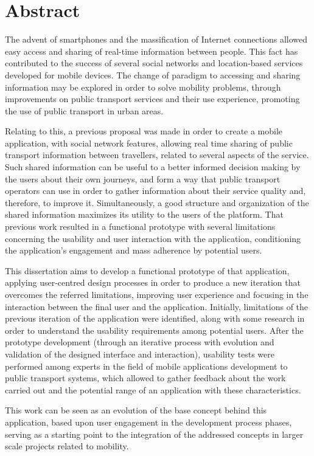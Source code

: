 \chapter*{Abstract}

The advent of smartphones and the massification of Internet connections allowed easy access and sharing of real-time information between people. This fact has contributed to the success of several social networks and location-based services developed for mobile devices. The change of paradigm to accessing and sharing information may be explored in order to solve mobility problems, through improvements on public transport services and their use experience, promoting the use of public transport in urban areas.

Relating to this, a previous proposal was made in order to create a mobile application, with social network features, allowing real time sharing of public transport information between travellers, related to several aspects of the service. Such shared information can be useful to a better informed decision making by the users about their own journeys, and form a way that public transport operators can use in order to gather information about their service quality and, therefore, to improve it. Simultaneously, a good structure and organization of the shared information maximizes its utility to the users of the platform. That previous work resulted in a functional prototype with several limitations concerning the usability and user interaction with the application, conditioning the application's engagement and mass adherence by potential users.

This dissertation aims to develop a functional prototype of that application, applying user-centred design processes in order to produce a new iteration that overcomes the referred limitations, improving user experience and focusing in the interaction between the final user and the application. Initially, limitations of the previous iteration of the application were identified, along with some research in order to understand the usability requirements among potential users. After the prototype development (through an iterative process with evolution and validation of the designed interface and interaction), usability tests were performed among experts in the field of mobile applications development to public transport systems, which allowed to gather feedback about the work carried out and the potential range of an application with these characteristics.

This work can be seen as an evolution of the base concept behind this application, based upon user engagement in the development process phases, serving as a starting point to the integration of the addressed concepts in larger scale projects related to mobility.

